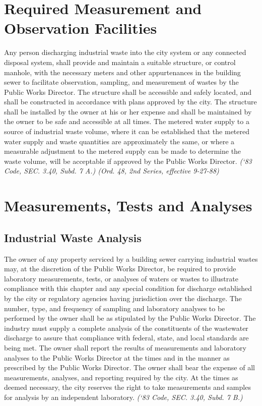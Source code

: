 \documentclass[code.tex]{subfiles}
\begin{document}
\section{Required Measurement and Observation Facilities}
Any person discharging industrial waste into the city system or any connected disposal system, shall provide and maintain a suitable structure, or control manhole, with the necessary meters and other appurtenances in the building sewer to facilitate observation, sampling, and measurement of wastes by the Public Works Director. The structure shall be accessible and safely located, and shall be constructed in accordance with plans approved by the city. The structure shall be installed by the owner at his or her expense and shall be maintained by the owner to be safe and accessible at all times. The metered water supply to a source of industrial waste volume, where it can be established that the metered water supply and waste quantities are approximately the same, or where a measurable adjustment to the metered supply can be made to determine the waste volume, will be acceptable if approved by the Public Works Director.\newline
\emph{(‘83 Code, SEC. 3.40, Subd. 7 A.) (Ord. 48, 2nd Series, effective 9-27-88)}
\section{Measurements, Tests and Analyses}
\subsection{Industrial Waste Analysis}
The owner of any property serviced by a building sewer carrying industrial wastes may, at the discretion of the Public Works Director, be required to provide laboratory measurements, tests, or analyses of waters or wastes to illustrate compliance with this chapter and any special condition for discharge established by the city or regulatory agencies having jurisdiction over the discharge.  The number, type, and frequency of sampling and laboratory analyses to be performed by the owner shall be as stipulated by the Public Works Director.  The industry must supply a complete analysis of the constituents of the wastewater discharge to assure that compliance with federal, state, and local standards are being met.  The owner shall report the results of measurements and laboratory analyses to the Public Works Director at the times and in the manner as prescribed by the Public Works Director.  The owner shall bear the expense of all measurements, analyses, and reporting required by the city.  At the times as deemed necessary, the city reserves the right to take measurements and samples for analysis by an independent laboratory.\newline
\emph{(‘83 Code, SEC. 3.40, Subd. 7 B.)}
\end{document}
